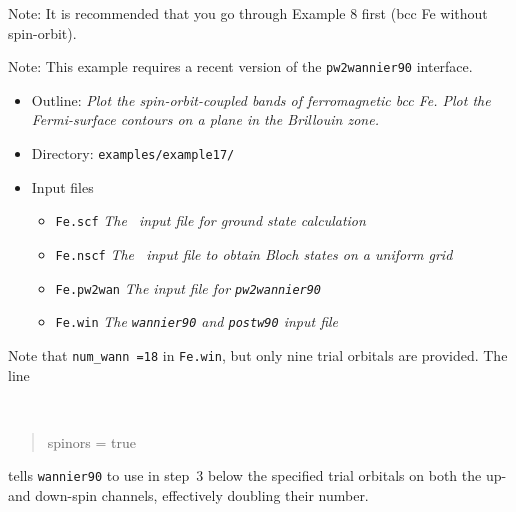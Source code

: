 \documentclass[a4paper,11pt,twoside]{article}
\begin{document}



Note: It is recommended that you go through Example 8 first (bcc Fe
without spin-orbit).

Note: This example requires a recent version of the {\tt pw2wannier90} interface.

\begin{itemize}
\item{Outline: \it{Plot the spin-orbit-coupled bands of ferromagnetic
      bcc Fe.  Plot the Fermi-surface contours on a plane in the
      Brillouin zone.}}
\item{Directory: {\tt examples/example17/}}
\item{Input files}
\begin{itemize}
\item{ {\tt Fe.scf} {\it The \pwscf\ input file for ground state
    calculation}}
\item{ {\tt Fe.nscf}  {\it The \pwscf\ input file to obtain Bloch
    states on a uniform grid}} 
\item{ {\tt Fe.pw2wan}  {\it The input file for {\tt pw2wannier90}}}

\item{ {\tt Fe.win}  {\it The {\tt wannier90} and {\tt postw90} input file}}
\end{itemize}
\end{itemize}

Note that {\tt num\_wann =18} in {\tt Fe.win}, but only nine trial
orbitals are provided. The line
  {\tt
\begin{quote}
spinors = true
\end{quote}
}tells {\tt wannier90} to use in step~3 below the specified trial
orbitals on both the up- and down-spin channels, effectively doubling
their number.
\end{document}
